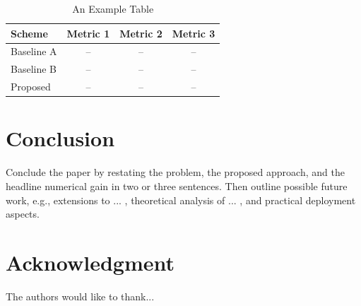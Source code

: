 \documentclass[conference]{IEEEtran}
\begin{document}
\begin{table}[!t]
\caption{An Example Table}
\label{tab:comparison}
\centering
\begin{tabular}{@{}lccc@{}}
\toprule
Scheme & Metric 1 & Metric 2 & Metric 3\\
\midrule
Baseline A & -- & -- & --\\
Baseline B & -- & -- & --\\
Proposed    & -- & -- & --\\
\bottomrule
\end{tabular}
\end{table}

\section{Conclusion}\label{sec:conclusion}
Conclude the paper by restating the problem, the proposed approach, and the headline numerical gain in two or three sentences. Then outline possible future work, e.g., extensions to ... , theoretical analysis of ... , and practical deployment aspects.

\section*{Acknowledgment}
The authors would like to thank...



\end{document}

